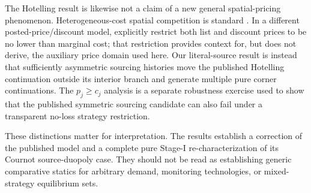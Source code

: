 The Hotelling result is likewise not a claim of a new general spatial-pricing phenomenon.  Heterogeneous-cost spatial competition is standard \cite{Vogel2008}.  In a different posted-price/discount model, \cite{GillThanassoulis2016} explicitly restrict both list and discount prices to be no lower than marginal cost; that restriction provides context for, but does not derive, the auxiliary price domain used here.  Our literal-source result is instead that sufficiently asymmetric sourcing histories move the published Hotelling continuation outside its interior branch and generate multiple pure corner continuations.  The \(p_j\ge c_j\) analysis is a separate robustness exercise used to show that the published symmetric sourcing candidate can also fail under a transparent no-loss strategy restriction.

These distinctions matter for interpretation.  The results establish a correction of the published model and a complete pure Stage-I re-characterization of its Cournot source-duopoly case.  They should not be read as establishing generic comparative statics for arbitrary demand, monitoring technologies, or mixed-strategy equilibrium sets.
